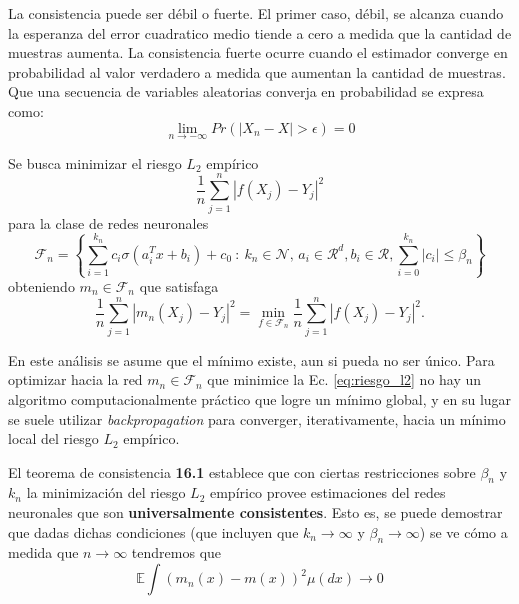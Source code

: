 \documentclass[12pt]{extarticle}
\newenvironment{comentarios_meta}
    {\begin{framed}\noindent\textcolor{red}{\textbf{\#}}}
    {\end{framed}}
\begin{document}
    La consistencia puede ser débil o fuerte. El primer caso, débil, se alcanza cuando la esperanza del error cuadratico medio tiende a cero a medida que la cantidad de muestras aumenta. La consistencia fuerte ocurre cuando el estimador converge en probabilidad al valor verdadero a medida que aumentan la cantidad de muestras. Que una secuencia de variables aleatorias converja en probabilidad se expresa como:
    \begin{equation*}
        \lim_{n \to -\infty} Pr(|X_n - X| > \epsilon) = 0
    \end{equation*}
    
    Se busca minimizar el riesgo $L_2$ empírico
    \begin{equation}
        \label{eq:riesgo_l2}
        \frac{1}{n} \sum_{j=1}^{n} | f(X_j) - Y_j |^2
    \end{equation}
    para la clase de redes neuronales
    \begin{equation*}
	    \mathcal{F}_n = \left\{  \sum_{i=1}^{k_n} c_i \sigma\left(a_i^T x + b_i\right) + c_0 \::\: k_n \in \mathcal{N},\, a_i \in \mathcal{R}^d, b_i \in \mathcal{R}, \sum_{i=0}^{k_n} \left|c_i\right| \leq \beta_n  \right\}
    \end{equation*}
    obteniendo $m_n \in \mathcal{F}_n$ que satisfaga
    \begin{equation*}
        \frac{1}{n} \sum_{j=1}^{n} {\left| m_n(X_j) - Y_j \right|}^2
        = \min_{f \in \mathcal{F}_n} \frac{1}{n} \sum_{j=1}^{n} {\left| f(X_j) - Y_j \right|}^2.
    \end{equation*}
    
    En este análisis se asume que el mínimo existe, aun si pueda no ser único. Para optimizar hacia la red $m_n \in \mathcal{F}_n$ que minimice la Ec. \ref{eq:riesgo_l2} no hay un algoritmo computacionalmente práctico que logre un mínimo global, y en su lugar se suele utilizar \textit{backpropagation} para converger, iterativamente, hacia un mínimo local del riesgo $L_2$ empírico.

    El teorema de consistencia \textbf{16.1} establece que con ciertas restricciones sobre $\beta_n$ y $k_n$ la minimización del riesgo $L_2$ empírico provee estimaciones del redes neuronales que son \textbf{universalmente consistentes}. Esto es, se puede demostrar que dadas dichas condiciones (que incluyen que $k_n \to \infty$ y $\beta_n \to \infty$) se ve cómo a medida que $n \to \infty$ tendremos que
    \begin{equation}
        \label{eq:weak_univ_cons}
        \mathds{E} \int {(m_n(x) - m(x))}^{2} \mu(dx) \to 0
    \end{equation}
    
\end{document}
